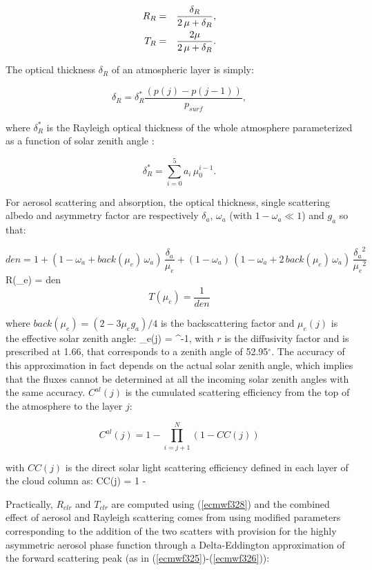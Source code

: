 \medskip
\begin{eqnarray}\label{ecmwf327}
R_R &=& \frac{\delta_R}{2 \, \mu + \delta_R}, \cr
T_R &=& \frac{2 \mu}{2 \, \mu + \delta_R}.
\end{eqnarray}
\medskip

The optical thickness $\delta_R$ of an atmospheric layer is simply:

\medskip
\[
\delta_R = \delta_R^{*} \frac{(p(j) - p(j-1))}{p_{surf}},
\]
\medskip

\noindent where $\delta_R^{*}$ is the Rayleigh optical thickness of the whole
atmosphere parameterized as a function of solar zenith angle
\citep{Deschamps1983}:

\[
\delta_R^{*} = \sum_{i=0}^5{a_i \, \mu_0^{i-1}}.
\]
\medskip

For aerosol scattering and absorption, the optical thickness, single scattering
albedo and asymmetry factor are respectively $\delta_a$, $\omega_a$ (with $1-\omega_a \ll 1$) and $g_a$ so that:

\medskip
\[
den = 1 + ( 1 - \omega_a + back(\mu_e) \, \omega_a ) \, \frac{\delta_a}{\mu_e} + ( 1 - \omega_a ) \, (1 - \omega_a + 2 \,  back(\mu_e) \, \omega_a ) \, \frac{{\delta_a}^2}{{\mu_e}^2}
\]
%
\be
R(\mu_e) =  {den}
\label{ecmwf328}
\ee
\[
T(\mu_e) = \frac{1}{den}
\]
\medskip

\noindent where $back(\mu_e) = (2 - 3 \mu_e g_a)/4$ is the
backscattering factor and $\mu_e(j)$ is the effective solar zenith angle:
\medskip
\be
\mu_e(j) = ^{-1},
\label{ecmwf315}
\ee
with $r$ is the diffusivity factor and is prescribed at 1.66, that corresponds to a zenith angle of 52.95$^\circ$. The accuracy of this approximation in fact depends on the actual solar zenith angle, which implies that the fluxes cannot be determined at all the incoming solar zenith angles with the same accuracy. $C^{al}(j)$ is the cumulated scattering efficiency from the top of the atmosphere to the layer $j$:
\noindent

\[
C^{al}(j) = 1 - \prod_{i=j+1}^N{(1 - CC(j))}
\]

\noindent
with $CC(j)$ is the direct solar light scattering efficiency defined in each layer of the cloud column as:
\be
CC(j) = 1 -\exp{}
\label{ecmwf316b}
\ee
\medskip

Practically, $R_{clr}$ and $T_{clr}$ are computed using (\ref{ecmwf328}) and the
combined effect of aerosol and Rayleigh scattering comes from using modified
parameters corresponding to the addition of the two scatters with provision for
the highly asymmetric aerosol phase function through a Delta-Eddington
approximation of the forward scattering peak
(as in (\ref{ecmwf325})-(\ref{ecmwf326})):

